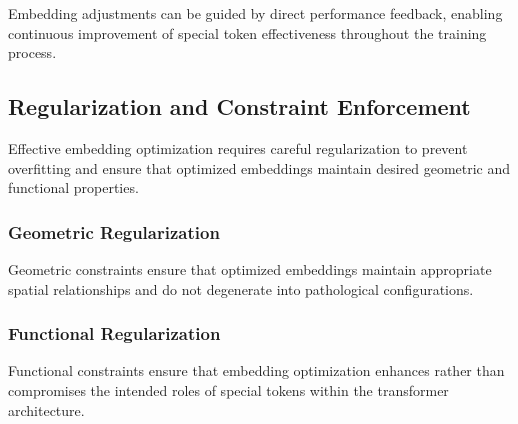 Embedding adjustments can be guided by direct performance feedback, enabling continuous improvement of special token effectiveness throughout the training process.

\subsection{Regularization and Constraint Enforcement}

Effective embedding optimization requires careful regularization to prevent overfitting and ensure that optimized embeddings maintain desired geometric and functional properties.

\subsubsection{Geometric Regularization}

Geometric constraints ensure that optimized embeddings maintain appropriate spatial relationships and do not degenerate into pathological configurations.

\subsubsection{Functional Regularization}

Functional constraints ensure that embedding optimization enhances rather than compromises the intended roles of special tokens within the transformer architecture.
